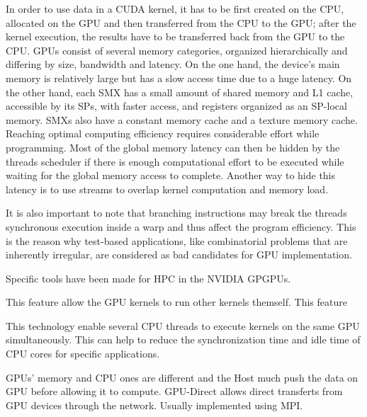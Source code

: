 In order to use data in a CUDA kernel, it has to be first created on the CPU, allocated on the GPU and then transferred from the CPU to the GPU; after the kernel execution, the results have to be transferred back from the GPU to the CPU. 
GPUs consist of several memory categories, organized hierarchically and differing by size, bandwidth and latency.   
On the one hand, the device's main memory is relatively large but has a slow access time due to a huge latency. 
On the other hand, each SMX has a small amount of shared memory and L1 cache, accessible by its SPs, with faster access, and registers organized as an SP-local memory. 
SMXs also have a constant memory cache and a texture memory cache.
Reaching optimal computing efficiency requires considerable effort while programming.
Most of the global memory latency can then be hidden by the threads scheduler if there is enough computational effort to be executed while waiting for the global memory access to complete. Another way to hide this latency is to use streams to overlap kernel computation and memory load. 

It is also important to note that branching instructions may break the threads synchronous execution inside a warp and thus affect the program efficiency. 
This is the reason why test-based applications, like combinatorial problems that are inherently irregular, are considered as bad candidates for GPU implementation. 

Specific tools have been made for HPC in the NVIDIA GPGPUs. 
\begin{description}
	\item[Dynamic Parallelism] This feature allow the GPU kernels to run other kernels themself. This feature 
	\item[Hyper-Q] This technology enable several CPU threads to execute kernels on the same GPU simultaneously. This can help to reduce the synchronization time and idle time of CPU cores for specific applications.
	\item[NVIDIA GPU-Direct] GPUs' memory and CPU ones are different and the Host much push the data on GPU before allowing it to compute. GPU-Direct allows direct transferts from GPU devices through the network. Usually implemented using MPI.  
\end{description}

